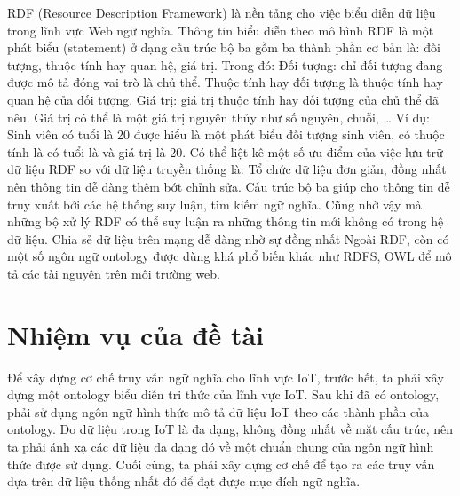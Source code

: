 RDF (Resource Description Framework) là nền tảng cho việc biểu diễn dữ liệu trong lĩnh vực Web ngữ nghĩa. Thông tin biểu diễn theo mô hình RDF là một phát biểu (statement) ở dạng cấu trúc bộ ba gồm ba thành phần cơ bản là: đối tượng, thuộc tính hay quan hệ, giá trị. Trong đó:
Đối tượng: chỉ đối tượng đang được mô tả đóng vai trò là chủ thể.
Thuộc tính hay đối tượng là thuộc tính hay quan hệ của đối tượng.
Giá trị: giá trị thuộc tính hay đối tượng của chủ thể đã nêu. Giá trị có thể là một giá
trị nguyên thủy như số nguyên, chuỗi, …
Ví dụ: Sinh viên có tuổi là 20 được hiểu là một phát biểu đối tượng sinh viên, có thuộc tính là có tuổi là và giá trị là 20.
Có thể liệt kê một số ưu điểm của việc lưu trữ dữ liệu RDF so với dữ liệu truyền thống là: 
Tổ chức dữ liệu đơn giản, đồng nhất nên thông tin dễ dàng thêm bớt chỉnh sửa.
Cấu trúc bộ ba giúp cho thông tin dễ truy xuất bởi các hệ thống suy luận, tìm kiếm ngữ nghĩa. Cũng nhờ vậy mà những bộ xử lý RDF có thể suy luận ra những thông tin mới không có trong hệ dữ liệu.
Chia sẻ dữ liệu trên mạng dễ dàng nhờ sự đồng nhất  
Ngoài RDF, còn có một số ngôn ngữ ontology được dùng khá phổ biến khác như RDFS, OWL để mô tả các tài nguyên trên môi trường web.

\section{Nhiệm vụ của đề tài}
Để xây dựng cơ chế truy vấn ngữ nghĩa cho lĩnh vực IoT, trước hết, ta phải xây dựng một ontology biểu diễn tri thức của lĩnh vực IoT. Sau khi đã có ontology, phải sử dụng ngôn ngữ hình thức mô tả dữ liệu IoT theo các thành phần của ontology. Do dữ liệu trong IoT là đa dạng, không đồng nhất về mặt cấu trúc, nên ta phải ánh xạ các dữ liệu đa dạng đó về một chuẩn chung của ngôn ngữ hình thức được sử dụng. Cuối cùng, ta phải xây dựng cơ chế để tạo ra các truy vấn dựa trên dữ liệu thống nhất đó để đạt được mục đích ngữ nghĩa.
















